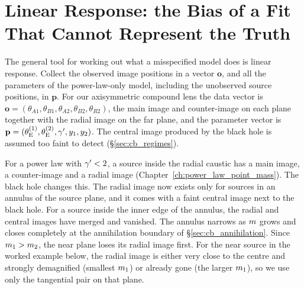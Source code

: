 \section{Linear Response: the Bias of a Fit That Cannot Represent the Truth}
\label{sec:cb_linear}

The general tool for working out what a misspecified model does is
linear response. Collect the observed image positions in a vector
$\mathbf{o}$, and all the parameters of the power-law-only model,
including the unobserved source positions, in $\mathbf{p}$. For our
axisymmetric compound lens the data vector is
$\mathbf{o}=(\theta_{A1},\theta_{B1},\theta_{A2},\theta_{B2},\theta_{R2})$,
the main image and counter-image on each plane together with the radial
image on the far plane, and the parameter vector is
$\mathbf{p}=(\theta_{\mathrm{E}}^{(1)},\theta_{\mathrm{E}}^{(2)},\gamma',y_1,y_2)$.
The central image produced by the black hole is assumed too faint to
detect (\S\ref{sec:cb_regimes}).

\begin{annotation}
For a power law with $\gamma'<2$, a source inside the radial caustic has a
main image, a counter-image and a radial image
(Chapter~\ref{ch:power_law_point_mass}). The black hole changes this.
The radial image now exists only for sources in an annulus of the
source plane, and it comes with a faint central image next to the black
hole. For a source inside the inner edge of the annulus, the radial and
central images have merged and vanished. The annulus narrows as $m$
grows and closes completely at the annihilation boundary of
\S\ref{sec:cb_annihilation}. Since $m_1>m_2$, the near plane loses
its radial image first. For the near source in the worked example below,
the radial image is either very close to the centre and strongly
demagnified (smallest $m_1$) or already gone (the larger $m_1$),
so we use only the tangential pair on that plane.
\end{annotation}

